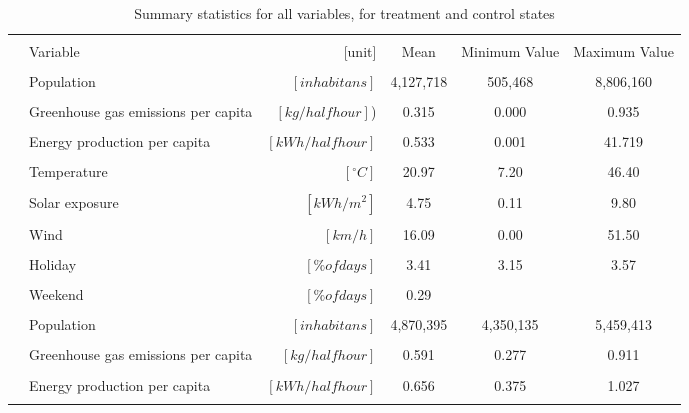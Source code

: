 \begin{landscape}
 \begin{table}[!htbp] \centering
 \caption[Summary Statistics]{\label{tab:summary stats}Summary statistics for all variables, for treatment and control states}
 \begin{tabular}{@{\extracolsep{5pt}}clrccc}
 \hline \hline
    &&&&&\\ [-1.8ex]
  & \multicolumn{1}{l}{Variable} & \multicolumn{1}{r}{[unit]} & \multicolumn{1}{c}{Mean} & \multicolumn{1}{c}{Minimum Value} & \multicolumn{1}{c}{Maximum Value}\\
 \hline
  \parbox[t]{2mm}{}&&&&&\\ [-1.8ex]
   &Population& \([inhabitans]\)& 4,127,718& 505,468 & 8,806,160\\
 &&&&&\\
  &Greenhouse gas emissions per capita& \([kg/half hour]\))& 0.315 & 0.000 & 0.935\\[-1.8ex]
  &&&&&\\
 &Energy production per capita & \([kWh/half hour]\) & 0.533 & 0.001 &41.719\\[-1.8ex]
  &&&&&\\
&Temperature & \([^{\circ}C]\) & 20.97 & 7.20 &46.40\\[-1.8ex]
  &&&&&\\
 &Solar exposure& \([kWh/m^2]\) & 4.75 & 0.11& 9.80\\[-1.8ex]
  &&&&&\\
 &Wind& \([km/h]\) & 16.09 & 0.00 & 51.50\\[-1.8ex]
  &&&&&\\
 &Holiday& \([\% of days]\) &3.41 &3.15 &3.57\\[-1.8ex]
  &&&&&\\
 &Weekend& \([\% of days]\) &0.29&&\\
 \hline
  \parbox[t]{2mm}{}&&&&&\\ [-1.8ex]
   &Population& \([inhabitans]\)&4,870,395 &4,350,135 &5,459,413\\
  &&&&&\\
 &Greenhouse gas emissions per capita& \([kg/half hour]\)& 0.591 & 0.277 & 0.911\\[-1.8ex]
  &&&&&\\
    &Energy production per capita & \([kWh/half hour]\) & 0.656 & 0.375 & 1.027\\[-1.8ex]
  &&&&&\\

\end{tabular}
\end{table}
\end{landscape}
